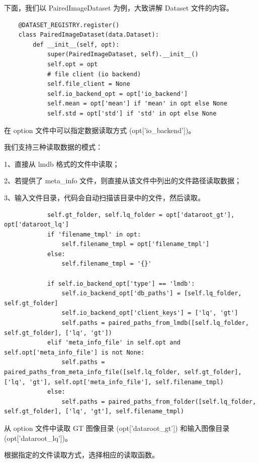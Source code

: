 \documentclass[../main.tex]{subfiles}
\begin{document}
    下面，我们以 PairedImageDataset 为例，大致讲解 Dataset 文件的内容。
    \begin{verbatim}
    @DATASET_REGISTRY.register()
    class PairedImageDataset(data.Dataset):
        def __init__(self, opt):
            super(PairedImageDataset, self).__init__()
            self.opt = opt
            # file client (io backend)
            self.file_client = None
            self.io_backend_opt = opt['io_backend']
            self.mean = opt['mean'] if 'mean' in opt else None
            self.std = opt['std'] if 'std' in opt else None
    \end{verbatim}
    
    在 option 文件中可以指定数据读取方式 (opt['io\_backend'])。
    
    我们支持三种读取数据的模式：
    
    1、直接从 lmdb 格式的文件中读取；
    
    2、若提供了 meta\_info 文件，则直接从该文件中列出的文件路径读取数据；
    
    3、输入文件目录，代码会自动扫描该目录中的文件，然后读取。
    
    
    \begin{verbatim}
            self.gt_folder, self.lq_folder = opt['dataroot_gt'], opt['dataroot_lq']
            if 'filename_tmpl' in opt:
                self.filename_tmpl = opt['filename_tmpl']
            else:
                self.filename_tmpl = '{}'
    
            if self.io_backend_opt['type'] == 'lmdb':
                self.io_backend_opt['db_paths'] = [self.lq_folder, self.gt_folder]
                self.io_backend_opt['client_keys'] = ['lq', 'gt']
                self.paths = paired_paths_from_lmdb([self.lq_folder, self.gt_folder], ['lq', 'gt'])
            elif 'meta_info_file' in self.opt and self.opt['meta_info_file'] is not None:
                self.paths = paired_paths_from_meta_info_file([self.lq_folder, self.gt_folder], ['lq', 'gt'], self.opt['meta_info_file'], self.filename_tmpl)
            else:
                self.paths = paired_paths_from_folder([self.lq_folder, self.gt_folder], ['lq', 'gt'], self.filename_tmpl)
	\end{verbatim}
	
	从 option 文件中读取 GT 图像目录 (opt['dataroot\_gt']) 和输入图像目录 (opt['dataroot\_lq'])。
	
	根据指定的文件读取方式，选择相应的读取函数。
	
\end{document}
